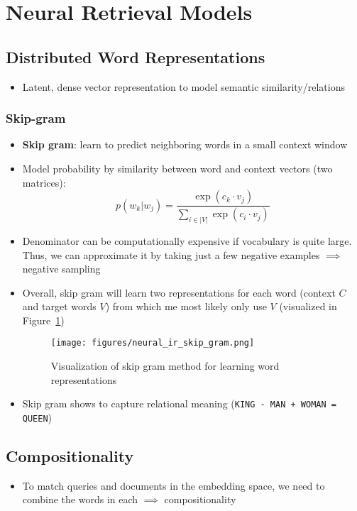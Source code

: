 \section{Neural Retrieval Models}
\subsection{Distributed Word Representations}
\begin{itemize}
	\item Latent, dense vector representation to model semantic similarity/relations
	
\end{itemize}
\subsubsection{Skip-gram}
\begin{itemize}
	\item \textbf{Skip gram}: learn to predict neighboring words in a small context window
	\item Model probability by similarity between word and context vectors (two matrices):
	$$p(w_k|w_j) = \frac{\exp\left(c_k \cdot v_j\right)}{\sum_{i\in|V|} \exp\left(c_i \cdot v_j\right)}$$
	\item Denominator can be computationally expensive if vocabulary is quite large. Thus, we can approximate it by taking just a few negative examples $\implies$ negative sampling
	\item Overall, skip gram will learn two representations for each word (context $C$ and target words $V$) from which me most likely only use $V$ (visualized in Figure~\ref{img:neural_ir_skip_gram})
	\begin{figure}[ht]
		\centering
		\texttt{[image: figures/neural\_ir\_skip\_gram.png]}
		\caption{Visualization of skip gram method for learning word representations}
		\label{img:neural_ir_skip_gram}
	\end{figure}
	\item Skip gram shows to capture relational meaning (\texttt{KING - MAN + WOMAN = QUEEN})
\end{itemize}
\subsection{Compositionality}
\begin{itemize}
	\item To match queries and documents in the embedding space, we need to combine the words in each $\implies$ compositionality
\end{itemize}

